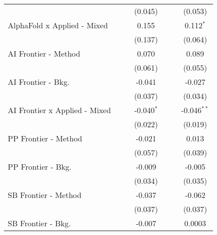 \begin{tabular}{lcccccc}
                                 &              &              & (0.045)      &              &               & (0.053)\\   
   AlphaFold x Applied - Mixed   &              &              & 0.155        &              &               & 0.112$^{*}$\\   
                                 &              &              & (0.137)      &              &               & (0.064)\\   
   AI Frontier - Method          &              &              & 0.070        &              &               & 0.089\\   
                                 &              &              & (0.061)      &              &               & (0.055)\\   
   AI Frontier - Bkg.            &              &              & -0.041       &              &               & -0.027\\   
                                 &              &              & (0.037)      &              &               & (0.034)\\   
   AI Frontier x Applied - Mixed &              &              & -0.040$^{*}$ &              &               & -0.046$^{**}$\\   
                                 &              &              & (0.022)      &              &               & (0.019)\\   
   PP Frontier - Method          &              &              & -0.021       &              &               & 0.013\\   
                                 &              &              & (0.057)      &              &               & (0.039)\\   
   PP Frontier - Bkg.            &              &              & -0.009       &              &               & -0.005\\   
                                 &              &              & (0.034)      &              &               & (0.035)\\   
   SB Frontier - Method          &              &              & -0.037       &              &               & -0.062\\   
                                 &              &              & (0.037)      &              &               & (0.037)\\   
   SB Frontier - Bkg.            &              &              & -0.007       &              &               & 0.0003\\   

\end{tabular}
